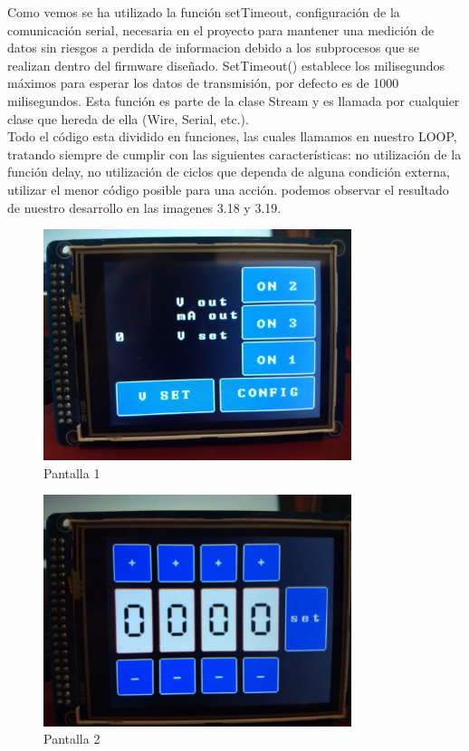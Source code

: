 Como vemos se ha utilizado la función setTimeout, configuración de la comunicación serial, necesaria en el proyecto para mantener una medición de datos sin riesgos a perdida de informacion debido a los subprocesos que se realizan dentro del firmware diseñado. SetTimeout() establece los milisegundos máximos para esperar los datos de transmisión, por defecto es de 1000 milisegundos. Esta función es parte de la clase Stream y es llamada por cualquier clase que hereda de ella (Wire, Serial, etc.). \cite{settime}\\


Todo el código esta dividido en funciones, las cuales llamamos en nuestro LOOP, tratando siempre de cumplir con las siguientes características: no utilización de la función delay, no utilización de ciclos que dependa de alguna condición externa, utilizar el menor código posible para una acción. podemos observar el resultado de nuestro desarrollo en las imagenes 3.18 y 3.19.\\

\begin{figure}[H]
\centering
\includegraphics[width=9cm]{Capitulo3/figs/pantalla1.jpg}
\caption{Pantalla 1}
\end{figure}

\begin{figure}[H]
\centering
\includegraphics[width=9cm]{Capitulo3/figs/pantalla2.jpg}
\caption{Pantalla 2}
\end{figure}

